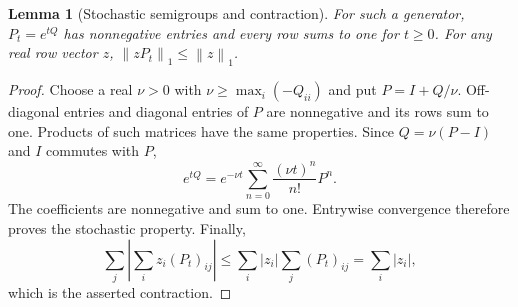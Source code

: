 \documentclass[11pt,a4paper]{article}
\theoremstyle{plain}
\newtheorem{lemma}[theorem]{Lemma}
\theoremstyle{definition}
\theoremstyle{remark}
\newcommand{\norm}[1]{\left\lVert #1\right\rVert}
\begin{document}
\begin{lemma}[Stochastic semigroups and contraction]
\label{lem:markov}
For such a generator, $P_t=e^{tQ}$ has nonnegative entries and every row
sums to one for $t\ge0$. For any real row vector $z$,
$\norm{zP_t}_1\le\norm z_1$.
\end{lemma}
\begin{proof}
Choose a real $\nu>0$ with $\nu\ge\max_i(-Q_{ii})$ and put
$P=I+Q/\nu$. Off-diagonal entries and diagonal entries of $P$ are
nonnegative and its rows sum to one. Products of such matrices have the
same properties. Since $Q=\nu(P-I)$ and $I$ commutes with $P$,
\[
 e^{tQ}=e^{-\nu t}\sum_{n=0}^\infty\frac{(\nu t)^n}{n!}P^n.
\]
The coefficients are nonnegative and sum to one. Entrywise convergence
therefore proves the stochastic property. Finally,
\[
 \sum_j\left|\sum_i z_i(P_t)_{ij}\right|
 \le\sum_i|z_i|\sum_j(P_t)_{ij}=\sum_i|z_i|,
\]
which is the asserted contraction.
\end{proof}
\end{document}
